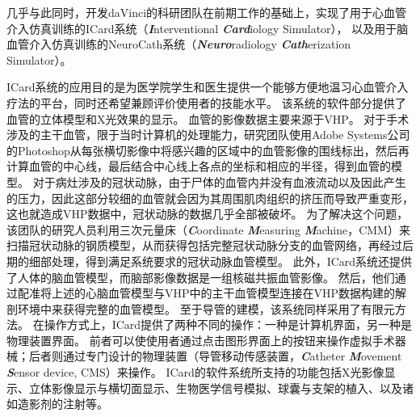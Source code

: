 几乎与此同时，开发daVinci的科研团队在前期工作的基础上，实现了用于心血管介入仿真训练的ICard系统（\textbf{\textit{I}}nterventional \textbf{\textit{Card}}iology Simulator）\cite{Wang1997ICard}\cite{Chui1998ICard}\cite{Wang1998ICard}\cite{Cai2004ICard}\cite{Cai2006ICard}，
以及用于脑血管介入仿真训练的NeuroCath系统（\textbf{\textit{Neuro}}radiology \textbf{\textit{Cath}}erization Simulator）\cite{Ma2000NeuroCath}\cite{Nowinski2000NeuroCath}\cite{Ma2001NeuroCath}\cite{Li2001NeuroCath}\cite{Nowinski2001NeuroCath}\cite{Anderson2001NeuroCath}\cite{Chui2002NeuroCath}\cite{Anderson2002NeuroCath}\cite{Ma2004NeuroCath}\cite{Volkau2005Vessel}\cite{Ma2005NeuroCath}\cite{Ma2006NeuroCath}\cite{Ma2006aNeuroCath}\cite{Ma2007NeuroCath}。

ICard系统的应用目的是为医学院学生和医生提供一个能够方便地温习心血管介入疗法的平台，同时还希望兼顾评价使用者的技能水平。
该系统的软件部分提供了血管的立体模型和X光效果的显示\cite{Wang1998ICard}\cite{Wang1998aICard}。
血管的影像数据主要来源于VHP。
对于手术涉及的主干血管，限于当时计算机的处理能力，研究团队使用Adobe Systems公司的Photoshop从每张横切影像中将感兴趣的区域中的血管影像的围线标出，然后再计算血管的中心线，最后结合中心线上各点的坐标和相应的半径，得到血管的模型\cite{Wang1998ICard}。
对于病灶涉及的冠状动脉，由于尸体的血管内并没有血液流动以及因此产生的压力，因此这部分较细的血管就会因为其周围肌肉组织的挤压而导致严重变形，这也就造成VHP数据中，冠状动脉的数据几乎全部被破坏\cite{Wang1998ICard}。
为了解决这个问题，该团队的研究人员利用三次元量床（\textbf{\textit{C}}oordinate \textbf{\textit{M}}easuring \textbf{\textit{M}}achine，CMM）\cite{CMMweb}来扫描冠状动脉的钢质模型\cite{KyotoModelweb}，从而获得包括完整冠状动脉分支的血管网络，再经过后期的细部处理，得到满足系统要求的冠状动脉血管模型\cite{Wang1998ICard}。
此外，ICard系统还提供了人体的脑血管模型\cite{Serra1997Vessel}\cite{Poston1995Vessel}，而脑部影像数据是一组核磁共振血管影像\cite{Wang1998ICard}。
然后，他们通过配准将上述的心脑血管模型与VHP中的主干血管模型连接在VHP数据构建的解剖环境中来获得完整的血管模型\cite{Wang1998ICard}。
至于导管的建模，该系统同样采用了有限元方法\cite{Wang1998ICard}。
在操作方式上，ICard提供了两种不同的操作：一种是计算机界面，另一种是物理装置界面\cite{Wang1998ICard}。
前者可以使使用者通过点击图形界面上的按钮来操作虚拟手术器械；后者则通过专门设计的物理装置（导管移动传感装置，\textbf{\textit{C}}atheter \textbf{\textit{M}}ovement \textbf{\textit{S}}ensor device, CMS）来操作\cite{Lim1998ICard}\cite{Lim1997ICard}。
ICard的软件系统所支持的功能包括X光影像显示、立体影像显示与横切面显示、生物医学信号模拟、球囊与支架的植入、以及诸如造影剂的注射等\cite{Wang1998ICard}。

